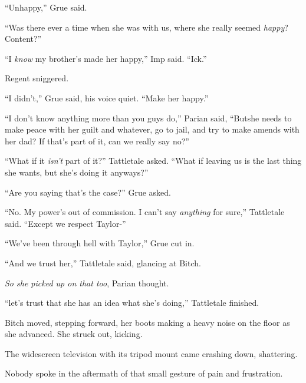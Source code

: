 ``Unhappy,'' Grue said.



``Was there ever a time when she was with us, where she really seemed \emph{happy}?  Content?''



``I \emph{know }my brother's made her happy,'' Imp said.  ``Ick.''



Regent sniggered.



``I didn't,'' Grue said, his voice quiet.  ``Make her happy.''



``I don't know anything more than you guys do,'' Parian said, ``But\ldotsMaybe she needs to make peace with her guilt and whatever, go to jail, and try to make amends with her dad?  If that's part of it, can we really say no?''



``What if it \emph{isn't }part of it?'' Tattletale asked.  ``What if leaving us is the last thing she wants, but she's doing it anyways?''



``Are you saying that's the case?'' Grue asked.



``No.  My power's out of commission.  I can't say \emph{anything} for sure,'' Tattletale said.  ``Except we respect Taylor-''



``We've been through hell with Taylor,'' Grue cut in.



``And we trust her,'' Tattletale said, glancing at Bitch.



\emph{So she picked up on that too}, Parian thought.



``\ldotsSo let's trust that she has an idea what she's doing,'' Tattletale finished.



Bitch moved, stepping forward, her boots making a heavy noise on the floor as she advanced.  She struck out, kicking.



The widescreen television with its tripod mount came crashing down, shattering.



Nobody spoke in the aftermath of that small gesture of pain and frustration.



